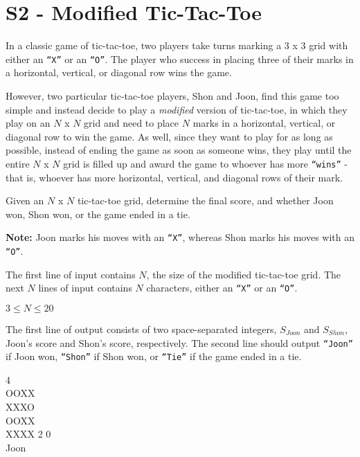 \section*{S2 - Modified Tic-Tac-Toe}
In a classic game of tic-tac-toe, two players take turns marking a $3$ x $3$ grid with either an \texttt{``X''} or an \texttt{``O''}. The player who success in placing three of their marks in a horizontal, vertical, or diagonal row wins the game. 

However, two particular tic-tac-toe players, Shon and Joon, find this game too simple and instead decide to play a \textit{modified} version of tic-tac-toe, in which they play on an $N$ x $N$ grid and need to place $N$ marks in a horizontal, vertical, or diagonal row to win the game. As well, since they want to play for as long as possible, instead of ending the game as soon as someone wins, they play until the entire $N$ x $N$ grid is filled up and award the game to whoever has more \texttt{``wins''} - that is, whoever has more horizontal, vertical, and diagonal rows of their mark.

Given an $N$ x $N$ tic-tac-toe grid, determine the final score, and whether Joon won, Shon won, or the game ended in a tie.

\textbf{Note:} Joon marks his moves with an \texttt{``X''}, whereas Shon marks his moves with an \texttt{``O''}.

The first line of input contains $N$, the size of the modified tic-tac-toe grid. The next $N$ lines of input contains $N$ characters, either an \texttt{``X''} or an \texttt{``O''}.

\constraints
$3 \leq N \leq 20$

\outputformat
The first line of output consists of two space-separated integers, $S_{Joon}$ and $S_{Shon}$, Joon's score and Shon's score, respectively. The second line should output \texttt{``Joon''} if Joon won, \texttt{``Shon''} if Shon won, or \texttt{``Tie''} if the game ended in a tie.

\addsample
{
    4 \\
    OOXX \\
    XXXO \\
    OOXX \\
    XXXX
}
{
    2 0 \\
    Joon
}